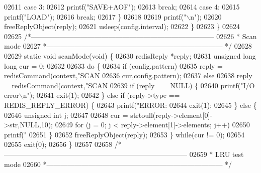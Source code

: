 \begin{DoxyCode}
{{{{{{{{{{{{{{{{{{{{{{{{{{{{{{{{{{{{{{{{{{{{{{{{{{{{{{{{{{{{{{{{{{{{{{{{{{{{{{{{{{{{{{{{{{{{{{{{{{{{02611         \textcolor{keywordflow}{case} 3:
02612             printf(\textcolor{stringliteral}{"SAVE+AOF"});
02613             \textcolor{keywordflow}{break};
02614         \textcolor{keywordflow}{case} 4:
02615             printf(\textcolor{stringliteral}{"LOAD"});
02616             \textcolor{keywordflow}{break};
02617         \}
02618 
02619         printf(\textcolor{stringliteral}{"\(\backslash\)n"});
02620         freeReplyObject(reply);
02621         usleep(config.interval);
02622     \}
02623 \}
02624 
02625 \textcolor{comment}{/*------------------------------------------------------------------------------}
02626 \textcolor{comment}{ * Scan mode}
02627 \textcolor{comment}{ *--------------------------------------------------------------------------- */}
02628 
02629 \textcolor{keyword}{static} \textcolor{keywordtype}{void} scanMode(\textcolor{keywordtype}{void}) \{
02630     redisReply *reply;
02631     \textcolor{keywordtype}{unsigned} \textcolor{keywordtype}{long} \textcolor{keywordtype}{long} cur = 0;
02632 
02633     \textcolor{keywordflow}{do} \{
02634         \textcolor{keywordflow}{if} (config.pattern)
02635             reply = redisCommand(context,\textcolor{stringliteral}{"SCAN %
02636                 cur,config.pattern);
02637         \textcolor{keywordflow}{else}
02638             reply = redisCommand(context,\textcolor{stringliteral}{"SCAN %
02639         \textcolor{keywordflow}{if} (reply == NULL) \{
02640             printf(\textcolor{stringliteral}{"I/O error\(\backslash\)n"});
02641             exit(1);
02642         \} \textcolor{keywordflow}{else} \textcolor{keywordflow}{if} (reply->type == REDIS\_REPLY\_ERROR) \{
02643             printf(\textcolor{stringliteral}{"ERROR: %
02644             exit(1);
02645         \} \textcolor{keywordflow}{else} \{
02646             \textcolor{keywordtype}{unsigned} \textcolor{keywordtype}{int} j;
02647 
02648             cur = strtoull(reply->element[0]->str,NULL,10);
02649             \textcolor{keywordflow}{for} (j = 0; j < reply->element[1]->elements; j++)
02650                 printf(\textcolor{stringliteral}{"%
02651         \}
02652         freeReplyObject(reply);
02653     \} \textcolor{keywordflow}{while}(cur != 0);
02654 
02655     exit(0);
02656 \}
02657 
02658 \textcolor{comment}{/*------------------------------------------------------------------------------}
02659 \textcolor{comment}{ * LRU test mode}
02660 \textcolor{comment}{ *--------------------------------------------------------------------------- */}
}}}}}}}}}}}}}}}}}}}}}}}}}}}}}}}}}}}}}}}}}}}}}}}}}}}}}}}}}}}}}}}}}}}}}}}}}}}}}}}}}}}}}}}}}}}}}}}}}}}}}}}}
\end{DoxyCode}
